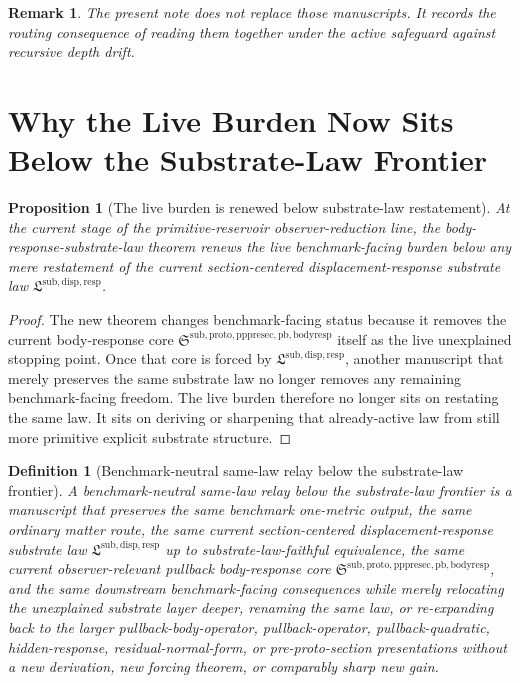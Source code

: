 \documentclass[11pt]{article}
\newcommand{\PullbackBodyResponseCore}{\mathfrak S^{\mathrm{sub,proto,pppresec,pb,bodyresp}}}
\newcommand{\SubstrateLaw}{\mathfrak L^{\mathrm{sub,disp,resp}}}
\newtheorem{definition}{Definition}
\newtheorem{proposition}{Proposition}
\newtheorem{remark}{Remark}
\begin{document}
\begin{remark}
The present note does not replace those manuscripts. It records the routing consequence of reading them together under the active safeguard against recursive depth drift.
\end{remark}

\section{Why the Live Burden Now Sits Below the Substrate-Law Frontier}

\begin{proposition}[The live burden is renewed below substrate-law restatement]
At the current stage of the primitive-reservoir observer-reduction line, the body-response-substrate-law theorem renews the live benchmark-facing burden below any mere restatement of the current section-centered displacement-response substrate law \(\SubstrateLaw\).
\end{proposition}

\begin{proof}
The new theorem changes benchmark-facing status because it removes the current body-response core \(\PullbackBodyResponseCore\) itself as the live unexplained stopping point. Once that core is forced by \(\SubstrateLaw\), another manuscript that merely preserves the same substrate law no longer removes any remaining benchmark-facing freedom. The live burden therefore no longer sits on restating the same law. It sits on deriving or sharpening that already-active law from still more primitive explicit substrate structure.
\end{proof}

\begin{definition}[Benchmark-neutral same-law relay below the substrate-law frontier]
A \emph{benchmark-neutral same-law relay below the substrate-law frontier} is a manuscript that preserves the same benchmark one-metric output, the same ordinary matter route, the same current section-centered displacement-response substrate law \(\SubstrateLaw\) up to substrate-law-faithful equivalence, the same current observer-relevant pullback body-response core \(\PullbackBodyResponseCore\), and the same downstream benchmark-facing consequences while merely relocating the unexplained substrate layer deeper, renaming the same law, or re-expanding back to the larger pullback-body-operator, pullback-operator, pullback-quadratic, hidden-response, residual-normal-form, or pre-proto-section presentations without a new derivation, new forcing theorem, or comparably sharp new gain.
\end{definition}
\end{document}
